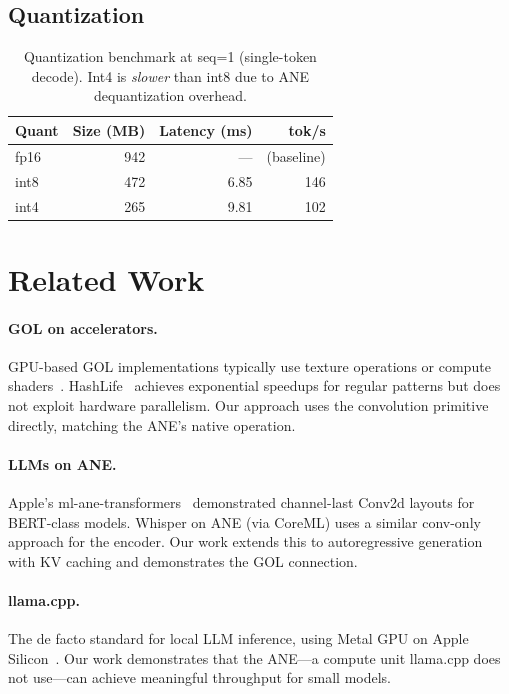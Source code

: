 \documentclass[11pt,twocolumn]{article}
\begin{document}
\subsection{Quantization}

\begin{table}[t]
\centering
\footnotesize
\begin{tabular}{lrrr}
\toprule
\textbf{Quant} & \textbf{Size (MB)} & \textbf{Latency (ms)} & \textbf{tok/s} \\
\midrule
fp16 & 942 & --- & (baseline) \\
int8 & 472 & 6.85 & 146 \\
int4 & 265 & 9.81 & 102 \\
\bottomrule
\end{tabular}
\caption{Quantization benchmark at seq=1 (single-token decode). Int4
is \emph{slower} than int8 due to ANE dequantization overhead.}
\label{tab:quant}
\end{table}


\section{Related Work}
\label{sec:related}

\paragraph{GOL on accelerators.} GPU-based GOL implementations
typically use texture operations or compute shaders~\cite{harris2005}.
HashLife~\cite{gosper1984} achieves exponential speedups for regular
patterns but does not exploit hardware parallelism. Our approach uses
the convolution primitive directly, matching the ANE's native
operation.

\paragraph{LLMs on ANE.} Apple's ml-ane-transformers~\cite{apple2022}
demonstrated channel-last Conv2d layouts for BERT-class models.
Whisper on ANE (via CoreML) uses a similar conv-only approach for the
encoder. Our work extends this to autoregressive generation with KV
caching and demonstrates the GOL connection.

\paragraph{llama.cpp.} The de facto standard for local LLM inference,
using Metal GPU on Apple Silicon~\cite{gerganov2023}. Our work
demonstrates that the ANE---a compute unit llama.cpp does not use---can
achieve meaningful throughput for small models.
\end{document}
